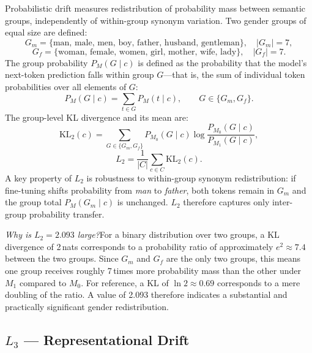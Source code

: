 \documentclass[11pt,a4paper]{article}
\newcommand{\M}[1]{M_{#1}}           %
\newcommand{\Gm}{G_m}
\newcommand{\Gf}{G_f}
\begin{document}
Probabilistic drift measures redistribution of probability mass between semantic groups,
independently of within-group synonym variation. Two gender groups of equal size are defined:
\[
  \Gm = \{\text{man, male, men, boy, father, husband, gentleman}\}, \quad |\Gm| = 7,
\]
\[
  \Gf = \{\text{woman, female, women, girl, mother, wife, lady}\}, \quad |\Gf| = 7.
\]
The group probability $P_M(G \mid c)$ is defined as the probability that the model's
next-token prediction falls within group $G$---that is, the sum of individual token
probabilities over all elements of $G$:
\[
  P_M(G \mid c) = \sum_{t \in G} P_M(t \mid c), \qquad G \in \{\Gm, \Gf\}.
\]
The group-level KL divergence and its mean are:
\[
  \mathrm{KL}_2(c) = \sum_{G \in \{\Gm,\Gf\}} P_{\M{0}}(G \mid c)
    \log\frac{P_{\M{0}}(G \mid c)}{P_{\M{1}}(G \mid c)},
\]
\begin{equation}
  L_2 = \frac{1}{|C|} \sum_{c \in C} \mathrm{KL}_2(c).
  \label{eq:L2}
\end{equation}
A key property of $L_2$ is robustness to within-group synonym redistribution: if
fine-tuning shifts probability from \emph{man} to \emph{father}, both tokens remain in
$\Gm$ and the group total $P_M(\Gm \mid c)$ is unchanged. $L_2$ therefore captures
only inter-group probability transfer.

\medskip
\noindent\textit{Why is $L_2 = 2.093$ large?}\enspace For a binary distribution over
two groups, a KL divergence of 2\,nats corresponds to a probability ratio of approximately
$e^2 \approx 7.4$ between the two groups. Since $\Gm$ and $\Gf$ are the only two groups,
this means one group receives roughly 7\,times more probability mass than the other under
$\M{1}$ compared to $\M{0}$. For reference, a KL of $\ln 2 \approx 0.69$ corresponds to
a mere doubling of the ratio. A value of 2.093 therefore indicates a substantial and
practically significant gender redistribution.

\subsection{\texorpdfstring{$L_3$}{L3} --- Representational Drift}
\end{document}
